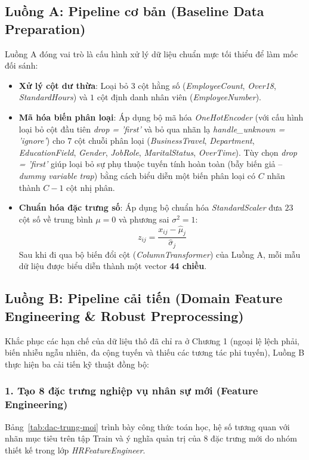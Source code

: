 \subsection{Luồng A: Pipeline cơ bản (Baseline Data Preparation)}
Luồng A đóng vai trò là cấu hình xử lý dữ liệu chuẩn mực tối thiểu để làm mốc đối sánh:
\begin{itemize}
    \item \textbf{Xử lý cột dư thừa}: Loại bỏ $3$ cột hằng số (\textit{EmployeeCount}, \textit{Over18}, \textit{StandardHours}) và $1$ cột định danh nhân viên (\textit{EmployeeNumber}).
    \item \textbf{Mã hóa biến phân loại}: Áp dụng bộ mã hóa \textit{OneHotEncoder} (với cấu hình loại bỏ cột đầu tiên \textit{drop = 'first'} và bỏ qua nhãn lạ \textit{handle\_unknown = 'ignore'}) cho $7$ cột chuỗi phân loại (\textit{BusinessTravel}, \textit{Department}, \textit{EducationField}, \textit{Gender}, \textit{JobRole}, \textit{MaritalStatus}, \textit{OverTime}). Tùy chọn \textit{drop = 'first'} giúp loại bỏ sự phụ thuộc tuyến tính hoàn toàn (bẫy biến giả -- \textit{dummy variable trap}) bằng cách biểu diễn một biến phân loại có $C$ nhãn thành $C-1$ cột nhị phân.
    \item \textbf{Chuẩn hóa đặc trưng số}: Áp dụng bộ chuẩn hóa \textit{StandardScaler} đưa $23$ cột số về trung bình $\mu = 0$ và phương sai $\sigma^2 = 1$:
    \[
        z_{ij} = \frac{x_{ij} - \hat{\mu}_j}{\hat{\sigma}_j}
    \]
    Sau khi đi qua bộ biến đổi cột (\textit{ColumnTransformer}) của Luồng A, mỗi mẫu dữ liệu được biểu diễn thành một vector \textbf{44 chiều}.
\end{itemize}

\subsection{Luồng B: Pipeline cải tiến (Domain Feature Engineering \& Robust Preprocessing)}
Khắc phục các hạn chế của dữ liệu thô đã chỉ ra ở Chương 1 (ngoại lệ lệch phải, biến nhiễu ngẫu nhiên, đa cộng tuyến và thiếu các tương tác phi tuyến), Luồng B thực hiện ba cải tiến kỹ thuật đồng bộ:

\subsubsection{1. Tạo 8 đặc trưng nghiệp vụ nhân sự mới (Feature Engineering)}
Bảng~\ref{tab:dac-trung-moi} trình bày công thức toán học, hệ số tương quan với nhãn mục tiêu trên tập Train và ý nghĩa quản trị của $8$ đặc trưng mới do nhóm thiết kế trong lớp \textit{HRFeatureEngineer}.


